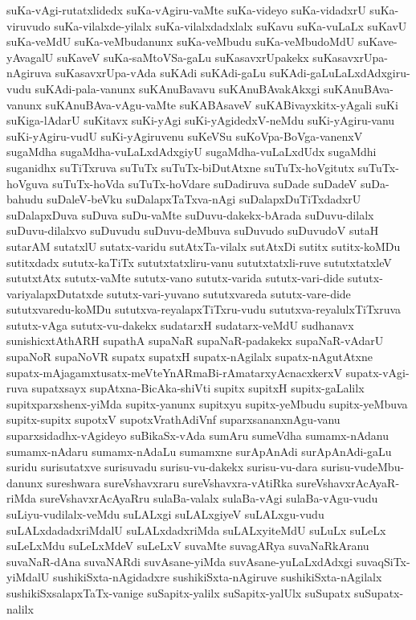 {suKa-vAgi-rutatxlidedx
suKa-vAgiru-vaMte
suKa-videyo
suKa-vidadxrU
suKa-viruvudo
suKa-vilalxde-yilalx
suKa-vilalxdadxlalx
suKavu
suKa-vuLaLx
suKavU
suKa-veMdU
suKa-veMbudanunx
suKa-veMbudu
suKa-veMbudoMdU
suKave-yAvagalU
suKaveV
suKa-saMtoVSa-gaLu
suKasavxrUpakekx
suKasavxrUpa-nAgiruva
suKasavxrUpa-vAda
suKAdi
suKAdi-gaLu
suKAdi-gaLuLaLxdAdxgiru-vudu
suKAdi-pala-vanunx
suKAnuBavavu
suKAnuBAvakAkxgi
suKAnuBAva-vanunx
suKAnuBAva-vAgu-vaMte
suKABAsaveV
suKABivayxkitx-yAgali
suKi
suKiga-lAdarU
suKitavx
suKi-yAgi
suKi-yAgidedxV-neMdu
suKi-yAgiru-vanu
suKi-yAgiru-vudU
suKi-yAgiruvenu
suKeVSu
suKoVpa-BoVga-vanenxV
sugaMdha
sugaMdha-vuLaLxdAdxgiyU
sugaMdha-vuLaLxdUdx
sugaMdhi
suganidhx
suTiTxruva
suTuTx
suTuTx-biDutAtxne
suTuTx-hoVgitutx
suTuTx-hoVguva
suTuTx-hoVda
suTuTx-hoVdare
suDadiruva
suDade
suDadeV
suDa-bahudu
suDaleV-beVku
suDalapxTaTxva-nAgi
suDalapxDuTiTxdadxrU
suDalapxDuva
suDuva
suDu-vaMte
suDuvu-dakekx-bArada
suDuvu-dilalx
suDuvu-dilalxvo
suDuvudu
suDuvu-deMbuva
suDuvudo
suDuvudoV
sutaH
sutarAM
sutatxlU
sutatx-varidu
sutAtxTa-vilalx
sutAtxDi
sutitx
sutitx-koMDu
sutitxdadx
sututx-kaTiTx
sututxtatxliru-vanu
sututxtatxli-ruve
sututxtatxleV
sututxtAtx
sututx-vaMte
sututx-vano
sututx-varida
sututx-vari-dide
sututx-variyalapxDutatxde
sututx-vari-yuvano
sututxvareda
sututx-vare-dide
sututxvaredu-koMDu
sututxva-reyalapxTiTxru-vudu
sututxva-reyalulxTiTxruva
sututx-vAga
sututx-vu-dakekx
sudatarxH
sudatarx-veMdU
sudhanavx
sunishicxtAthARH
supathA
supaNaR
supaNaR-padakekx
supaNaR-vAdarU
supaNoR
supaNoVR
supatx
supatxH
supatx-nAgilalx
supatx-nAgutAtxne
supatx-mAjagamxtusatx-meVteYnARmaBi-rAmatarxyAcnacxkerxV
supatx-vAgi-ruva
supatxsayx
supAtxna-BicAka-shiVti
supitx
supitxH
supitx-gaLalilx
supitxparxshenx-yiMda
supitx-yanunx
supitxyu
supitx-yeMbudu
supitx-yeMbuva
supitx-supitx
supotxV
supotxVrathAdiVnf
suparxsananxnAgu-vanu
suparxsidadhx-vAgideyo
suBikaSx-vAda
sumAru
sumeVdha
sumamx-nAdanu
sumamx-nAdaru
sumamx-nAdaLu
sumamxne
surApAnAdi
surApAnAdi-gaLu
suridu
surisutatxve
surisuvadu
surisu-vu-dakekx
surisu-vu-dara
surisu-vudeMbu-danunx
sureshwara
sureVshavxraru
sureVshavxra-vAtiRka
sureVshavxrAcAyaR-riMda
sureVshavxrAcAyaRru
sulaBa-valalx
sulaBa-vAgi
sulaBa-vAgu-vudu
suLiyu-vudilalx-veMdu
suLALxgi
suLALxgiyeV
suLALxgu-vudu
suLALxdadadxriMdalU
suLALxdadxriMda
suLALxyiteMdU
suLuLx
suLeLx
suLeLxMdu
suLeLxMdeV
suLeLxV
suvaMte
suvagARya
suvaNaRkAranu
suvaNaR-dAna
suvaNARdi
suvAsane-yiMda
suvAsane-yuLaLxdAdxgi
suvaqSiTx-yiMdalU
sushikiSxta-nAgidadxre
sushikiSxta-nAgiruve
sushikiSxta-nAgilalx
sushikiSxsalapxTaTx-vanige
suSapitx-yalilx
suSapitx-yalUlx
suSupatx
suSupatx-nalilx
}
